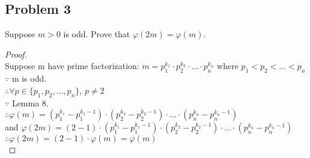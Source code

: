 \documentclass[paper=a4, fontsize=11pt]{scrartcl} %
\numberwithin{equation}{section} %
\numberwithin{figure}{section} %
\newcommand{\problem}[1]{\subsection *{Problem #1}}
\newcommand{\pnl}{$ $\newline\\}
\begin{document}
\problem 3 Suppose $m > 0$ is odd. Prove that $\varphi(2m) = \varphi(m)$.
\begin{proof}
\pnl
Suppose m have prime factorization: $m = p_{1}^{k_1} \cdot p_{2}^{k_2} \cdot \ldots \cdot p_{n}^{k_n}$ where $p_{1} < p_{2} < \ldots < p_{n}$\\
$\because$ m is odd.\\
$\therefore \forall p \in \{p_{1}, p_{2}, \ldots, p_{n}\}$, $p \neq 2$\\
$\because$ Lemma 8.\\
$\therefore \varphi(m) = ( p_{1}^{k_1} -  p_{1}^{k_1 - 1}) \cdot ( p_{2}^{k_2} -  p_{2}^{k_2 - 1}) \cdot \ldots \cdot ( p_{n}^{k_n} -  p_{n}^{k_n - 1})$\\
and $\varphi(2m) = (2-1) \cdot ( p_{1}^{k_1} -  p_{1}^{k_1 - 1}) \cdot ( p_{2}^{k_2} -  p_{2}^{k_2 - 1}) \cdot \ldots \cdot ( p_{n}^{k_n} -  p_{n}^{k_n - 1})$\\
$\therefore \varphi(2m) =  (2 - 1) \cdot \varphi(m) = \varphi(m)$\\
\end{proof}
\end{document}
